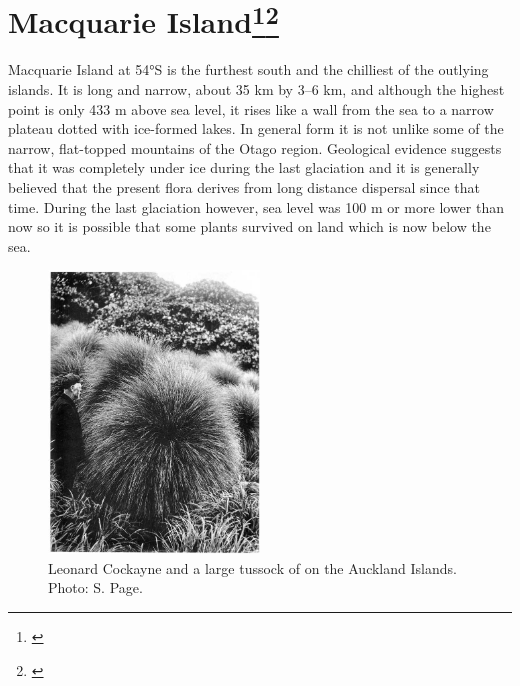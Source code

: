 \section[Macquarie Island]{Macquarie Island\footnote{\cite{taylor1955flora}}\footnote{\cite{seppelt1984vascular}}}

Macquarie Island at 54°S is the furthest south and the chilliest of the outlying islands.
It is long and narrow, about 35 km by 3--6 km, and although the highest point is only 433 m above sea level, it rises like a wall from the sea to a narrow plateau dotted with ice-formed lakes.
In general form it is not unlike some of the narrow, flat-topped mountains of the Otago region.
Geological evidence suggests that it was completely under ice during the last glaciation and it is generally believed that the present flora derives from long distance dispersal since that time.
During the last glaciation however, sea level was 100 m or more lower than now so it is possible that some plants survived on land which is now below the sea.

\begin{figure}
	\includegraphics[width=0.5\textwidth]{graphics/figure115cockayne.jpg}
	\centering
	\caption[Leonard Cockayne and a large tussock]{Leonard Cockayne and a large tussock of  on the Auckland Islands.
	Photo: S. Page.}%
	\label{fig:115cockayne}
\end{figure}


